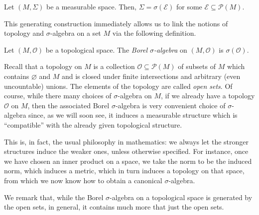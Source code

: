 \begin{theorem}
Let $(M,\Sigma)$ be a measurable space. Then, $\Sigma=\sigma(\mathcal{E})$ for some $\mathcal{E}\subseteq\mathscr{P}(M)$.
\end{theorem}

This generating construction immediately allows us to link the notions of topology and $\sigma$-algebra on a set $M$ via the following definition.

\begin{definition}
Let $(M,\mathcal{O})$ be a topological space. The \emph{Borel $\sigma$-algebra} on $(M,\mathcal{O})$ is $\sigma(\mathcal{O})$. 
\end{definition}

Recall that a topology on $M$ is a collection $\mathcal{O}\subseteq\mathscr{P}(M)$ of subsets of $M$ which contains $\varnothing$ and $M$ and is closed under finite intersections and arbitrary (even uncountable) unions. The elements of the topology are called \emph{open sets}.
Of course, while there many choices of $\sigma$-algebra on $M$, if we already have a topology $\mathcal{O}$ on $M$, then the associated Borel $\sigma$-algebra is very convenient choice of $\sigma$-algebra since, as we will soon see, it induces a measurable structure which is ``compatible'' with the already given topological structure.

This is, in fact, the usual philosophy in mathematics: we always let the stronger structures induce the weaker ones, unless otherwise specified. For instance, once we have chosen an inner product on a space, we take the norm to be the induced norm, which induces a metric, which in turn induces a topology on that space, from which we now know how to obtain a canonical $\sigma$-algebra. 

We remark that, while the Borel $\sigma$-algebra on a topological space is generated by the open sets, in general, it contains much more that just the open sets.

